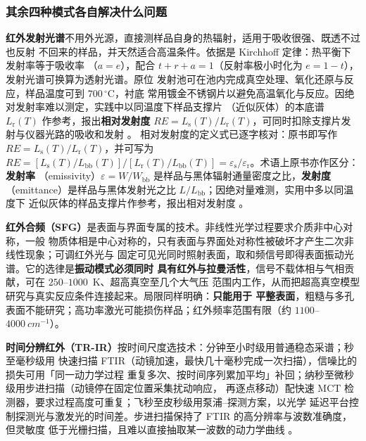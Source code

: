\subsubsection{其余四种模式各自解决什么问题}

\textbf{红外发射光谱}不用外光源，直接测样品自身的热辐射，适用于吸收很强、既透不过也反射
不回来的样品，并天然适合高温条件。依据是 Kirchhoff 定律：热平衡下发射率等于吸收率
（$a=e$），配合 $t+r+a=1$（反射率极小时化为 $e=1-t$），发射光谱可换算为透射光谱。原位
发射池可在池内完成真空处理、氧化还原与反应，样品温度可到 $700\,^{\circ}\mathrm{C}$，衬底
常用镀金不锈钢片以避免高温氧化与反应。因绝对发射率难以测定，实践中以同温度下样品支撑片
（近似灰体）的本底谱 $L_{\mathrm{r}}(T)$ 作参考，报出\textbf{相对发射度}
$RE=L_{\mathrm{s}}(T)/L_{\mathrm{r}}(T)$，可同时扣除支撑片发射与仪器光路的吸收和发射
。
相对发射度的定义式已逐字核对：原书即写作 $RE=L_{\mathrm{s}}(T)/L_{\mathrm{r}}(T)$，并可写为
$RE=\left[L_{\mathrm{s}}(T)/L_{\mathrm{bb}}(T)\right]\big/\left[L_{\mathrm{r}}(T)/L_{\mathrm{bb}}(T)\right]
=\varepsilon_{\mathrm{s}}/\varepsilon_{\mathrm{r}}$。术语上原书亦作区分：\textbf{发射率}
（emissivity）$\varepsilon=W/W_{\mathrm{bb}}$ 是样品与黑体辐射通量密度之比，\textbf{发射度}
（emittance）是样品与黑体发射光之比 $L/L_{\mathrm{bb}}$；因绝对量难测，实用中多以同温度下
近似灰体的样品支撑片作参考，报出相对发射度 。

\textbf{红外合频（SFG）}是表面与界面专属的技术。非线性光学过程要求介质非中心对称，一般
物质体相是中心对称的，只有表面与界面处对称性被破坏才产生二次非线性现象；可调红外光与
固定可见光同时照射表面，取和频信号即得表面振动光谱。它的选律是\textbf{振动模式必须同时
具有红外与拉曼活性}，信号不载体相与气相贡献，可在 $250$--$1000$~K、超高真空至几个大气压
范围内工作，从而把超高真空模型研究与真实反应条件连接起来。局限同样明确：\textbf{只能用于
平整表面}，粗糙与多孔表面不能研究；高功率激光可能损伤样品；红外频率范围有限（约
$1100$--$\qty{4000}{cm^{-1}}$）。

\textbf{时间分辨红外（TR-IR）}按时间尺度选技术：分钟至小时级用普通稳态采谱；秒至毫秒级用
快速扫描 FTIR（动镜加速，最快几十毫秒完成一次扫描），信噪比的损失可用「同一动力学过程
重复多次、按时间序列累加平均」补回；纳秒至微秒级用步进扫描（动镜停在固定位置采集扰动响应，
再逐点移动）配快速 MCT 检测器，要求过程高度可重复；飞秒至皮秒级用泵浦--探测方案，以光学
延迟平台控制探测光与激发光的时间差。步进扫描保持了 FTIR 的高分辨率与波数准确度，但灵敏度
低于光栅扫描，且难以直接抽取某一波数的动力学曲线
。

